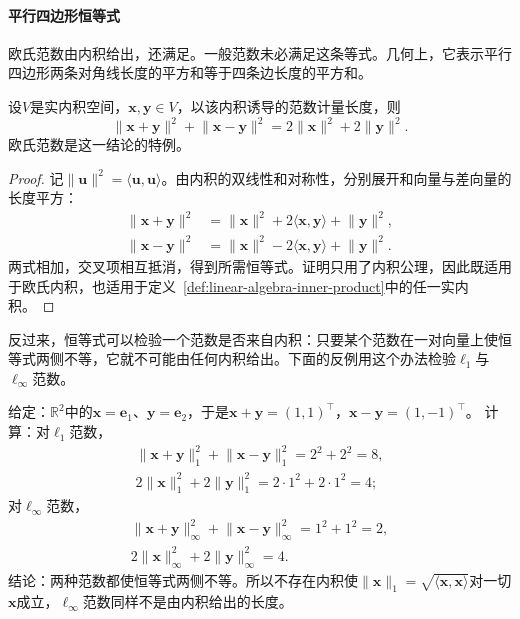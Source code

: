 \paragraph{平行四边形恒等式}
欧氏范数由内积给出，还满足。一般范数未必满足这条等式。几何上，它表示平行四边形两条对角线长度的平方和等于四条边长度的平方和。
\begin{theorem}[平行四边形恒等式]
\label{thm:linear-algebra-parallelogram}
设$V$是实内积空间，$\bm x,\bm y\in V$，以该内积诱导的范数计量长度，则
\begin{equation}
 \lVert\bm x+\bm y\rVert^2+\lVert\bm x-\bm y\rVert^2
 =2\lVert\bm x\rVert^2+2\lVert\bm y\rVert^2.
 \label{eq:functional-parallelogram-identity}
\end{equation}
欧氏范数是这一结论的特例。
\end{theorem}
\begin{proof}
记$\lVert\bm u\rVert^2=\langle\bm u,\bm u\rangle$。由内积的双线性和对称性，分别展开和向量与差向量的长度平方：
\[
 \begin{aligned}
 \lVert\bm x+\bm y\rVert^2
 &=\lVert\bm x\rVert^2+2\langle\bm x,\bm y\rangle+\lVert\bm y\rVert^2,\\
 \lVert\bm x-\bm y\rVert^2
 &=\lVert\bm x\rVert^2-2\langle\bm x,\bm y\rangle+\lVert\bm y\rVert^2.
 \end{aligned}
\]
两式相加，交叉项相互抵消，得到所需恒等式。证明只用了内积公理，因此既适用于欧氏内积，也适用于定义~\ref{def:linear-algebra-inner-product}中的任一实内积。
\end{proof}

反过来，恒等式可以检验一个范数是否来自内积：只要某个范数在一对向量上使恒等式两侧不等，它就不可能由任何内积给出。下面的反例用这个办法检验$\ell_1$与$\ell_\infty$范数。
\begin{example}
\label{ex:ls-l1-linf-not-inner-product}
给定：$\mathbb R^2$中的$\bm x=\bm e_1$、$\bm y=\bm e_2$，于是$\bm x+\bm y=(1,1)^\top$，$\bm x-\bm y=(1,-1)^\top$。
计算：对$\ell_1$范数，
\[
 \begin{gathered}
 \lVert\bm x+\bm y\rVert_1^2+\lVert\bm x-\bm y\rVert_1^2=2^2+2^2=8,\\
 2\lVert\bm x\rVert_1^2+2\lVert\bm y\rVert_1^2=2\cdot1^2+2\cdot1^2=4;
 \end{gathered}
\]
对$\ell_\infty$范数，
\[
 \begin{gathered}
 \lVert\bm x+\bm y\rVert_\infty^2+\lVert\bm x-\bm y\rVert_\infty^2=1^2+1^2=2,\\
 2\lVert\bm x\rVert_\infty^2+2\lVert\bm y\rVert_\infty^2=4.
 \end{gathered}
\]
结论：两种范数都使恒等式两侧不等。所以不存在内积使$\lVert\bm x\rVert_1=\sqrt{\langle\bm x,\bm x\rangle}$对一切$\bm x$成立，$\ell_\infty$范数同样不是由内积给出的长度。
\end{example}

